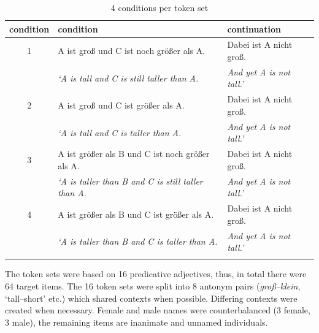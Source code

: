 \documentclass[output=paper,
modfonts
]{langscibook}
\begin{document}
\begin{table}[H]\scriptsize
\begin{tabular}{cll}
\lsptoprule
condition & condition & continuation \\
\midrule 
1 & A ist groß \hspace{25pt} und C ist noch größer als A. & Dabei ist A nicht groß. \\
 & \textit{`A is tall \hspace{32pt} and C is \hspace{0.4pt} still \hspace{2pt} taller than A.} & \textit{And yet A is not tall.'} \\
\midrule
2 & A ist groß \hspace{25pt} und C ist \hspace{16pt} größer als A. & Dabei ist A nicht groß.  \\
 & \textit{`A is tall \hspace{32pt} and C is \hspace{19pt} taller than A.} & \textit{And yet A is not tall.'} \\
\midrule 
3 & A ist größer als B \hspace{0.65pt} und C ist noch größer als A. & Dabei ist A nicht groß.  \\
 & \textit{`A is taller than B \hspace{2pt} and C is \hspace{0.4pt} still \hspace{2pt} taller than A.} & \textit{And yet A is not tall.'}  \\
\midrule
4 & A ist größer als B \hspace{0.65pt} und C ist \hspace{16pt} größer als A. & Dabei ist A nicht groß.   \\
 & \textit{`A is taller than B \hspace{2pt} and C is \hspace{19pt} taller than A.} & \textit{And yet A is not tall.'}  \\
\lspbottomrule
\end{tabular}
\caption{4 conditions per token set}
\label{tab:4_conds}
\end{table}

The token sets were based on 16 predicative adjectives, thus, in total there were 64 target items. The 16 token sets were split into 8 antonym pairs (\textit{groß--klein}, `tall--short' etc.) which shared contexts when possible. Differing contexts were created when necessary. Female and male names were counterbalanced (3 female, 3 male), the remaining items are inanimate and unnamed individuals.
\end{document}

